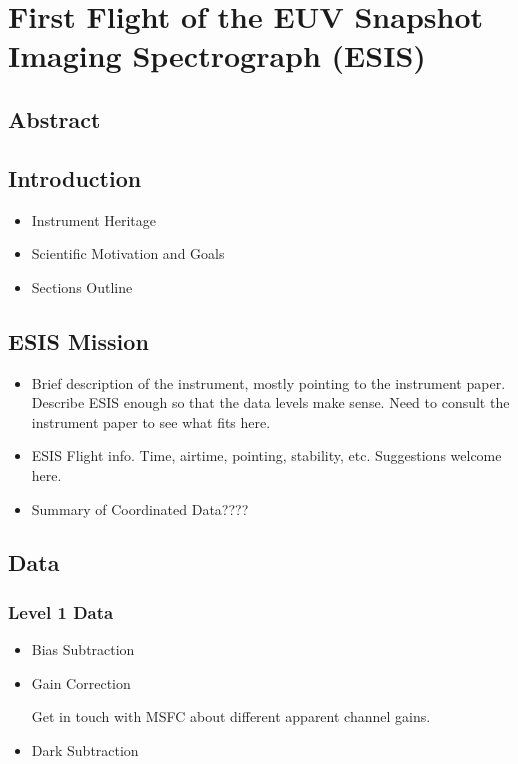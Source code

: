 \chapter{First Flight of the EUV Snapshot Imaging Spectrograph (ESIS)}

\section{Abstract}

\section{Introduction}
    \begin{itemize}
        \item Instrument Heritage
        \item Scientific Motivation and Goals
        \item Sections Outline
    \end{itemize}
    

\section{ESIS Mission}
    \begin{itemize}
        \item Brief description of the instrument, mostly pointing to the instrument paper.  Describe ESIS enough so that the data levels make sense. Need to consult the instrument paper to see what fits here. 
        \item ESIS Flight info.  Time, airtime, pointing, stability, etc.  Suggestions welcome here.
        \item Summary of Coordinated Data????
    \end{itemize}
	
\section{Data}

    \subsection{Level 1 Data}
        \begin{itemize}
            \item Bias Subtraction
            \item Gain Correction
            
                 Get in touch with MSFC about different apparent channel gains.
            \item Dark Subtraction
        \end{itemize}
       
